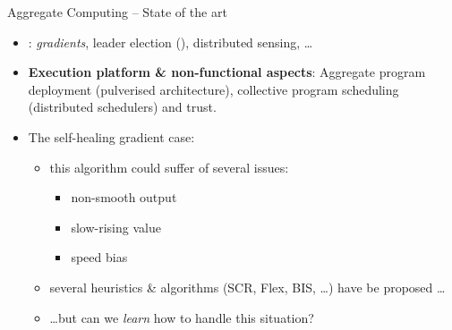 \documentclass[9pt, aspectratio=169, handout]{beamer}
\begin{document}
\begin{frame}{Aggregate Computing -- State of the art}
\begin{card}
  \begin{itemize}
    \item {}: \emph{gradients}, leader election (), distributed sensing, \dots
    \item \textbf{Execution platform \& non-functional aspects}: Aggregate program deployment (pulverised architecture), collective program scheduling (distributed schedulers) and trust.
  \end{itemize}
\end{card}
\begin{alarm}[Challenges]
  \begin{itemize}
    \item The self-healing gradient case:
    \begin{itemize}
      \item this algorithm could suffer of several issues:
      \begin{itemize}
        \item[\faArrowRight] non-smooth output
        \item[\faArrowRight] slow-rising value
        \item[\faArrowRight] speed bias
      \end{itemize}
      \item several heuristics \& algorithms (SCR, Flex, BIS, \dots) have be proposed \dots
      \item \dots but can we \emph{learn} how to handle this situation?
    \end{itemize}
  \end{itemize}
\end{alarm}
\end{frame}
\end{document}
